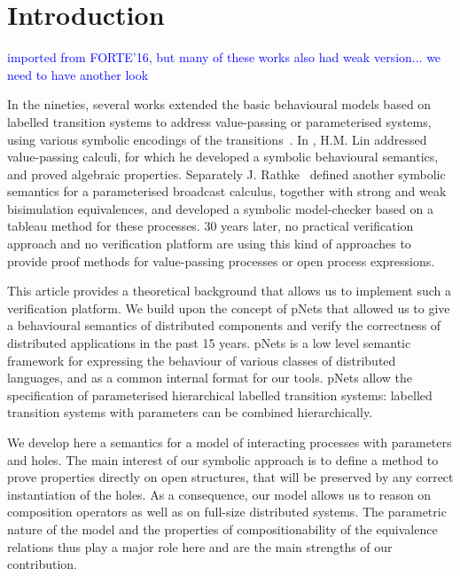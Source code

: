 \documentclass{lmcs}
\newcommand{\ERIC}[1]{\textcolor{blue}{#1}}
\begin{document}
\tableofcontents

\section{Introduction}

\ERIC{imported from FORTE'16, but many of these works also had weak
  version... we need to have another look}

In the nineties, several 
works extended the basic behavioural models based on labelled
transition systems to address value-passing or parameterised systems, using
various symbolic encodings of the
transitions~\cite{deSimone85,Larsen87,HennessyLin:TCS95,Linconcur96}. 
In \cite{Linconcur96}, H.M. Lin addressed value-passing calculi, for which he
developed a symbolic behavioural semantics, and proved algebraic properties.
Separately J. Rathke~\cite{HennessyRathke:TCS98} defined another
symbolic semantics for 
a parameterised broadcast calculus, together with strong and weak bisimulation
equivalences, and developed a symbolic model-checker based on a tableau
method for these processes. 30 years later, no
practical verification approach and no verification platform are
using this kind of approaches to provide proof methods for
value-passing processes or open process expressions. 


This article provides a theoretical background that allows us to implement such a verification platform. We build upon the concept of pNets that allowed us to give a behavioural semantics of distributed components and verify the correctness of distributed applications in the past 15 years. pNets  is a
low level semantic framework for expressing the behaviour of various
classes of distributed languages, and as a common internal format for
our tools.  pNets allow the
specification of parameterised hierarchical labelled
transition systems:  labelled transition systems with parameters can be
combined hierarchically.


We develop here a semantics for a model of interacting processes with parameters and holes. 
The main interest of our symbolic approach is to define a method to
prove properties directly on open structures, that will be preserved
by any correct instantiation of the holes.
As a consequence, our model allows us to reason on composition
operators as well as on full-size distributed systems. The parametric
nature of the model and the properties of compositionability of the
equivalence relations thus play a major role here and are the main
strengths of  our contribution. 
\end{document}
